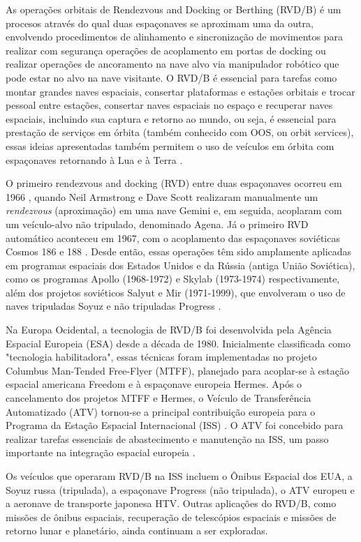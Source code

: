 As operações orbitais de Rendezvous and Docking or Berthing (RVD/B) é um procesos através do qual duas espaçonaves se aproximam uma da outra, envolvendo procedimentos de alinhamento e sincronização de movimentos para realizar com segurança operações de acoplamento em portas de docking ou realizar operações de ancoramento na nave alvo via manipulador robótico que pode estar no alvo na nave visitante. O RVD/B é essencial para tarefas como montar grandes naves espaciais, consertar plataformas e estações orbitais e trocar pessoal entre estações, consertar naves espaciais no espaço e recuperar naves espaciais, incluindo sua captura e retorno ao mundo, ou seja, é essencial para prestação de serviços em órbita (também conhecido com OOS, on orbit services), essas ideias apresentadas também permitem o uso de veículos em órbita com espaçonaves retornando à Lua e à Terra \cite{fehse2003}.

O primeiro rendezvous and docking (RVD) entre duas espaçonaves ocorreu em 1966 \cite{nasa1stDocking}, quando Neil Armstrong e Dave Scott realizaram manualmente um \textit{rendezvous} (aproximação) em uma nave Gemini e, em seguida, acoplaram com um veículo-alvo não tripulado, denominado Agena. Já o primeiro RVD automático aconteceu em 1967, com o acoplamento das espaçonaves soviéticas Cosmos 186 e 188 \cite{fehse2003}. Desde então, essas operações têm sido amplamente aplicadas em programas espaciais dos Estados Unidos e da Rússia (antiga União Soviética), como os programas Apollo (1968-1972) e Skylab (1973-1974) respectivamente, além dos projetos soviéticos Salyut e Mir (1971-1999), que envolveram o uso de naves tripuladas Soyuz e não tripuladas Progress \cite{fehse2003}.

Na Europa Ocidental, a tecnologia de RVD/B foi desenvolvida pela Agência Espacial Europeia (ESA) desde a década de 1980. Inicialmente classificada como "tecnologia habilitadora", essas técnicas foram implementadas no projeto Columbus Man-Tended Free-Flyer (MTFF), planejado para acoplar-se à estação espacial americana Freedom \cite{goelz1992MtffFreedom} e à espaçonave europeia Hermes. Após o cancelamento dos projetos MTFF e Hermes, o Veículo de Transferência Automatizado (ATV) tornou-se a principal contribuição europeia para o Programa da Estação Espacial Internacional (ISS) \cite{ellwood2007ATV2ISS}. O ATV foi concebido para realizar tarefas essenciais de abastecimento e manutenção na ISS, um passo importante na integração espacial europeia \cite{fehse2003}.

Os veículos que operaram RVD/B na ISS incluem o Ônibus Espacial dos EUA, a Soyuz russa (tripulada), a espaçonave Progress (não tripulada), o ATV europeu e a aeronave de transporte japonesa HTV. Outras aplicações do RVD/B, como missões de ônibus espaciais, recuperação de telescópios espaciais e missões de retorno lunar e planetário, ainda continuam a ser exploradas.

